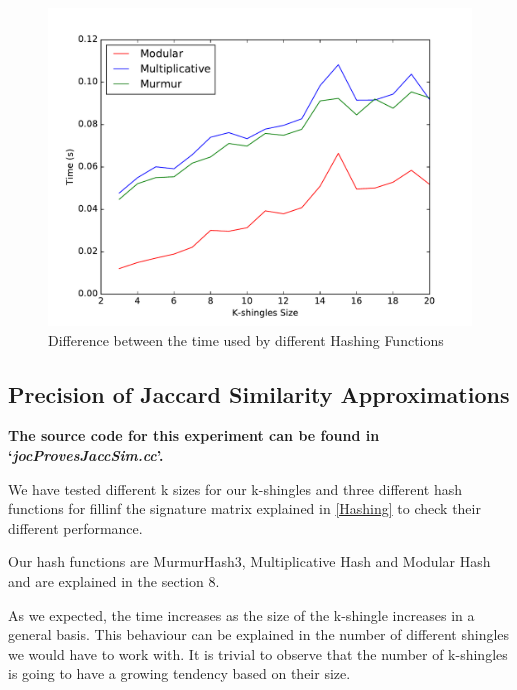 \documentclass[12pt]{article}
\begin{document}
\begin{figure}[H]
	\centering
	\includegraphics[scale=0.55]{graphs/HashFunctionsJaccardAproxTime.pdf} 
	\caption{Difference between the time used by different Hashing Functions}
	\label{fig:HhashFunctionsTime}
\end{figure}


\subsection{Precision of Jaccard Similarity Approximations}
\textbf{The source code for this experiment can be found in `\textit{jocProvesJaccSim.cc}'.}
\bigskip

We have tested different k sizes for our k-shingles and three different hash functions for fillinf the signature matrix explained in \autoref{Hashing} to check their different performance.

Our hash functions are MurmurHash3, Multiplicative Hash and Modular Hash and are explained in the section 8.

As we expected, the time increases as the size of the k-shingle increases in a general basis. This behaviour can be explained in the number of different shingles we would have to work with. It is trivial to observe that the number of k-shingles is going to have a growing tendency based on their size. 
\end{document}
